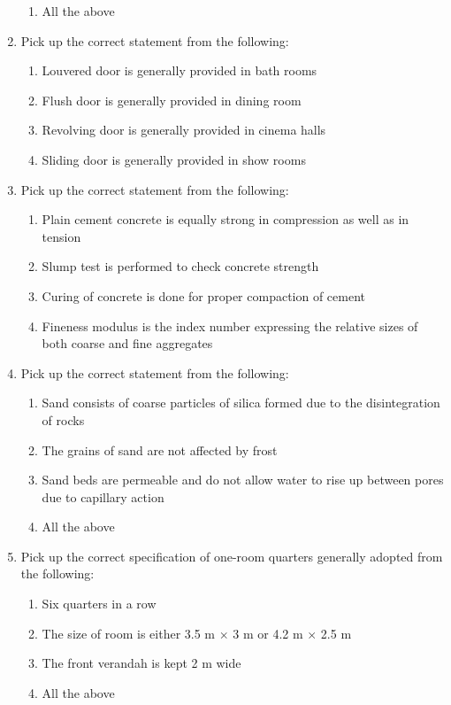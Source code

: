 \documentclass[11pt,a4paper]{article}
\begin{document}
\begin{enumerate}
\begin{enumerate}[label=\Alph*.]
\item{All the above}
\end{enumerate}
\item{Pick up the correct statement from the following:}
\begin{enumerate}[label=\Alph*.]
\item{Louvered door is generally provided in bath rooms}
\item{Flush door is generally provided in dining room}
\item{Revolving door is generally provided in cinema halls}
\item{Sliding door is generally provided in show rooms}
\end{enumerate}
\item{Pick up the correct statement from the following:}
\begin{enumerate}[label=\Alph*.]
\item{Plain cement concrete is equally strong in compression as well as in tension}
\item{Slump test is performed to check concrete strength}
\item{Curing of concrete is done for proper compaction of cement}
\item{Fineness modulus is the index number expressing the relative sizes of both coarse and fine aggregates}
\end{enumerate}
\item{Pick up the correct statement from the following:}
\begin{enumerate}[label=\Alph*.]
\item{Sand consists of coarse particles of silica formed due to the disintegration of rocks}
\item{The grains of sand are not affected by frost}
\item{Sand beds are permeable and do not allow water to rise up between pores due to capillary action}
\item{All the above}
\end{enumerate}
\item{Pick up the correct specification of one-room quarters generally adopted from the following:}
\begin{enumerate}[label=\Alph*.]
\item{Six quarters in a row}
\item{The size of room is either 3.5 m $\times$ 3 m or 4.2 m $\times$ 2.5 m}
\item{The front verandah is kept 2 m wide}
\item{All the above}

\end{enumerate}
\end{enumerate}
\end{document}
